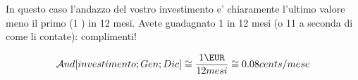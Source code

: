 In questo caso l'andazzo del vostro investimento e' chiaramente l'ultimo valore meno il primo (1 \EUR ) in 12 mesi. Avete 
guadagnato 1 \EUR in 12 mesi (o 11 a seconda di come li contate): complimenti!

\begin{equation}
  \andazzo[investimento; Gen; Dic] \cong  \frac{1 \EUR}{12 mesi} \cong 0.08 cents/mese
\end{equation}







